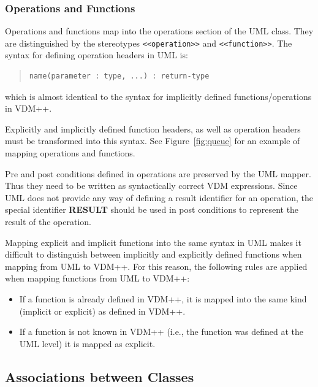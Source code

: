 \documentclass[\pformat,12pt]{article}
\newcommand{\vdmpp}{VDM++}
\begin{document}
\subsubsection*{Operations and Functions}
  
Operations and functions map into the operations section of the UML
class. They are distinguished by the stereotypes {\tt <<operation>>}
and {\tt <<function>>}. The syntax for defining operation headers in
UML is:

\begin{quote}
\begin{verbatim}
name(parameter : type, ...) : return-type  
\end{verbatim}
\end{quote}
  
which is almost identical to the syntax for implicitly defined
functions/operations in \vdmpp{}.

Explicitly and implicitly defined function headers, as well as
operation headers must be transformed into this syntax. See
Figure~\ref{fig:queue} for an example of mapping operations and
functions. 

Pre and post conditions defined in operations are preserved by the UML
mapper. Thus they need to be written as syntactically correct VDM
expressions. Since UML does not provide any way of defining a result
identifier for an operation, the special identifier \textbf{RESULT}
should be used in post conditions to represent the result of the
operation. 

Mapping explicit and implicit functions into the same syntax in UML
makes it difficult to distinguish between implicitly and explicitly
defined functions when mapping from UML to \vdmpp{}. For this reason,
the following rules are applied when mapping functions from UML to
\vdmpp{}:

\begin{itemize}
\item If a function is already defined in \vdmpp{}, it is mapped into
  the same kind (implicit or explicit) as defined in \vdmpp{}.
\item If a function is not known in \vdmpp{} (i.e., the function was
  defined at the UML level) it is mapped as explicit.
\end{itemize}

\subsection{Associations between Classes}
\label{assoclasses}
  
\end{document}
